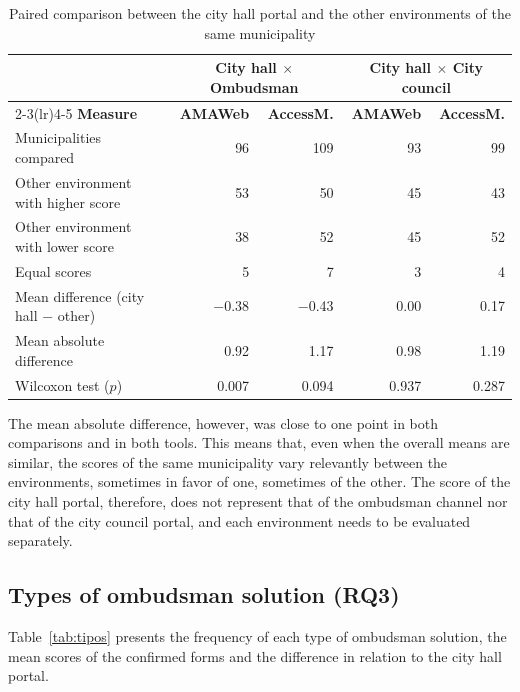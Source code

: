\documentclass[12pt]{article}
\begin{document}
\begin{table}[ht]
\centering
\caption{Paired comparison between the city hall portal and the other environments of the same municipality}
\label{tab:pareado}
\small
\setlength{\tabcolsep}{4pt}
\begin{tabular}{lrrrr}
\toprule
 & \multicolumn{2}{c}{\textbf{City hall $\times$ Ombudsman}} & \multicolumn{2}{c}{\textbf{City hall $\times$ City council}} \\
\cmidrule(lr){2-3}\cmidrule(lr){4-5}
\textbf{Measure} & \textbf{AMAWeb} & \textbf{AccessM.} & \textbf{AMAWeb} & \textbf{AccessM.} \\
\midrule
Municipalities compared                        & 96 & 109 & 93 & 99 \\
Other environment with higher score            & 53 & 50 & 45 & 43 \\
Other environment with lower score             & 38 & 52 & 45 & 52 \\
Equal scores                                   & 5 & 7 & 3 & 4 \\
Mean difference (city hall $-$ other)          & $-$0.38 & $-$0.43 & 0.00 & 0.17 \\
Mean absolute difference                       & 0.92 & 1.17 & 0.98 & 1.19 \\
Wilcoxon test ($p$)                            & 0.007 & 0.094 & 0.937 & 0.287 \\
\bottomrule
\end{tabular}
\end{table}

The mean absolute difference, however, was close to one point in both comparisons and in both tools. This means that, even when the overall means are similar, the scores of the same municipality vary relevantly between the environments, sometimes in favor of one, sometimes of the other. The score of the city hall portal, therefore, does not represent that of the ombudsman channel nor that of the city council portal, and each environment needs to be evaluated separately.

\subsection{Types of ombudsman solution (RQ3)}

Table~\ref{tab:tipos} presents the frequency of each type of ombudsman solution, the mean scores of the confirmed forms and the difference in relation to the city hall portal.
\end{document}
